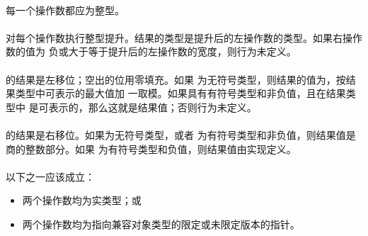 \constraint
\paragraph{}
每一个操作数都应为整型。

\semantic
\paragraph{}
对每个操作数执行整型提升。结果的类型是提升后的左操作数的类型。如果右操作数的值为
负或大于等于提升后的左操作数的宽度，则行为未定义。

\paragraph{}
的结果是左移位；空出的位用零填充。如果
为无符号类型，则结果的值为，按结果类型中可表示的最大值加
一取模。如果具有有符号类型和非负值，且在结果类型中
是可表示的，那么这就是结果值；否则行为未定义。

\paragraph{}
的结果是右移位。如果为无符号类型，或者
为有符号类型和非负值，则结果值是商的整数部分。如果
为有符号类型和负值，则结果值由实现定义。

\syntax
\paragraph{}

\constraint
\paragraph{}
以下之一应该成立：
\begin{itemize}
  \item{两个操作数均为实类型；或}
  \item{两个操作数均为指向兼容对象类型的限定或未限定版本的指针。}
\end{itemize}

